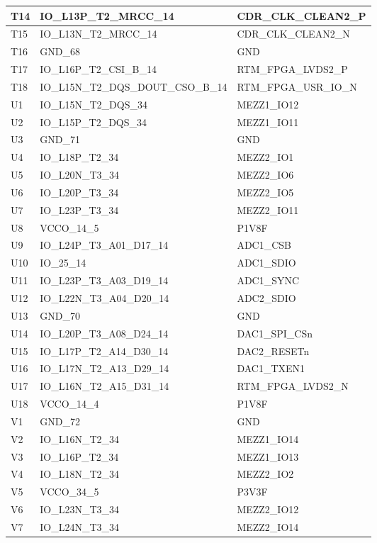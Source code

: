 \begin{footnotesize}
\begin{longtable}{|l|p{6cm}|p{6cm}|}
T14	&	IO\_L13P\_T2\_MRCC\_14	&	CDR\_CLK\_CLEAN2\_P	\\ \hline
T15	&	IO\_L13N\_T2\_MRCC\_14	&	CDR\_CLK\_CLEAN2\_N	\\ \hline
T16	&	GND\_68	&	GND	\\ \hline
T17	&	IO\_L16P\_T2\_CSI\_B\_14	&	RTM\_FPGA\_LVDS2\_P	\\ \hline
T18	&	IO\_L15N\_T2\_DQS\_DOUT\_CSO\_B\_14	&	RTM\_FPGA\_USR\_IO\_N	\\ \hline
U1	&	IO\_L15N\_T2\_DQS\_34	&	MEZZ1\_IO12	\\ \hline
U2	&	IO\_L15P\_T2\_DQS\_34	&	MEZZ1\_IO11	\\ \hline
U3	&	GND\_71	&	GND	\\ \hline
U4	&	IO\_L18P\_T2\_34	&	MEZZ2\_IO1	\\ \hline
U5	&	IO\_L20N\_T3\_34	&	MEZZ2\_IO6	\\ \hline
U6	&	IO\_L20P\_T3\_34	&	MEZZ2\_IO5	\\ \hline
U7	&	IO\_L23P\_T3\_34	&	MEZZ2\_IO11	\\ \hline
U8	&	VCCO\_14\_5	&	P1V8F	\\ \hline
U9	&	IO\_L24P\_T3\_A01\_D17\_14	&	ADC1\_CSB	\\ \hline
U10	&	IO\_25\_14	&	ADC1\_SDIO	\\ \hline
U11	&	IO\_L23P\_T3\_A03\_D19\_14	&	ADC1\_SYNC	\\ \hline
U12	&	IO\_L22N\_T3\_A04\_D20\_14	&	ADC2\_SDIO	\\ \hline
U13	&	GND\_70	&	GND	\\ \hline
U14	&	IO\_L20P\_T3\_A08\_D24\_14	&	DAC1\_SPI\_CSn	\\ \hline
U15	&	IO\_L17P\_T2\_A14\_D30\_14	&	DAC2\_RESETn	\\ \hline
U16	&	IO\_L17N\_T2\_A13\_D29\_14	&	DAC1\_TXEN1	\\ \hline
U17	&	IO\_L16N\_T2\_A15\_D31\_14	&	RTM\_FPGA\_LVDS2\_N	\\ \hline
U18	&	VCCO\_14\_4	&	P1V8F	\\ \hline
V1	&	GND\_72	&	GND	\\ \hline
V2	&	IO\_L16N\_T2\_34	&	MEZZ1\_IO14	\\ \hline
V3	&	IO\_L16P\_T2\_34	&	MEZZ1\_IO13	\\ \hline
V4	&	IO\_L18N\_T2\_34	&	MEZZ2\_IO2	\\ \hline
V5	&	VCCO\_34\_5	&	P3V3F	\\ \hline
V6	&	IO\_L23N\_T3\_34	&	MEZZ2\_IO12	\\ \hline
V7	&	IO\_L24N\_T3\_34	&	MEZZ2\_IO14	\\ \hline

\end{longtable}
\end{footnotesize}

